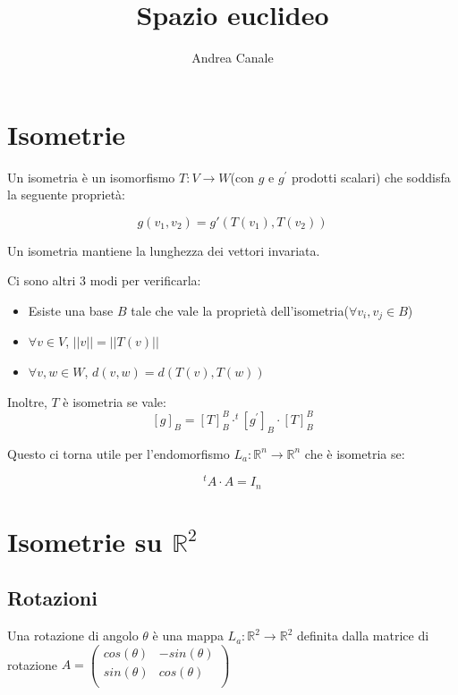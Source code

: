 \documentclass[a4paper, 10pt]{article}
\title{Spazio euclideo}
\author{Andrea Canale}
\begin{document}
	\maketitle
	\tableofcontents
	
\section{Isometrie}

Un isometria è un isomorfismo $T: V \rightarrow W$(con $g \text{ e } g^{'}$ prodotti scalari) che soddisfa la seguente proprietà:

$$g\left(v_1,v_2\right)=g'\left(T\left(v_1\right),T\left(v_2\right)\right)$$

Un isometria mantiene la lunghezza dei vettori invariata.

Ci sono altri 3 modi per verificarla:

\begin{itemize}
	\item Esiste una base $B$ tale che vale la proprietà dell'isometria($\forall v_i, v_j \in B$)
	\item $\forall v \in V$, $||v|| = ||T(v)||$
	\item $\forall v, w \in W$, $d(v,w) = d(T(v), T(w))$
\end{itemize}

Inoltre, $T$ è isometria se vale:
$$[g]_B = [T]^B_B \cdot ^t[g^{'}]_B \cdot [T]^B_B$$

Questo ci torna utile per l'endomorfismo $L_a: \mathbb{R}^n \rightarrow \mathbb{R}^n$ che è isometria se:

$$^t A \cdot A = I_n$$

\section{Isometrie su $\mathbb{R}^2$}

\subsection{Rotazioni}

Una rotazione di angolo $\theta$ è una mappa $L_a: \mathbb{R}^2 \rightarrow \mathbb{R}^2$ definita dalla matrice di rotazione $A=\left(\begin{matrix}cos\left(\theta\right)&-sin\left(\theta\right)\\sin\left(\theta\right)&cos\left(\theta\right)\\\end{matrix}\right)
$
\end{document}
